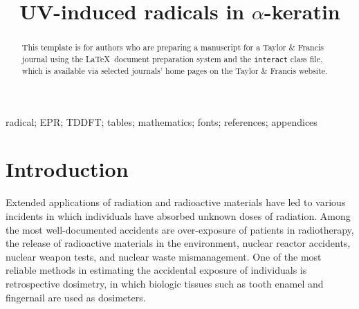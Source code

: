 \documentclass[]{interact}
\theoremstyle{plain}%
\theoremstyle{definition}
\theoremstyle{remark}
\begin{document}

\title{UV-induced radicals in $\alpha$-keratin}


\author{
}


\maketitle

\begin{abstract}
This template is for authors who are preparing a manuscript for a Taylor \& Francis journal using the \LaTeX\ document preparation system and the \texttt{interact} class file, which is available via selected journals' home pages on the Taylor \& Francis website.
\end{abstract}

\begin{keywords}
radical; EPR; TDDFT; tables; mathematics; fonts; references; appendices
\end{keywords}


\section{Introduction}


Extended applications of radiation and radioactive materials have led to various incidents in which individuals have absorbed unknown doses of radiation. Among the most well-documented accidents are over-exposure of patients in radiotherapy, the release of radioactive materials in the environment, nuclear reactor accidents, nuclear weapon tests, and nuclear waste mismanagement. One of the most reliable methods in estimating the accidental exposure of individuals is retrospective dosimetry, \cite{OpticalStimulated} in which biologic tissues such as tooth enamel and fingernail are used as dosimeters.
\end{document}
